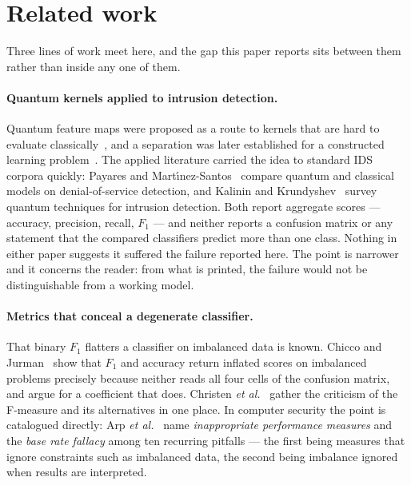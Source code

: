 \documentclass[runningheads]{llncs}
\newcommand{\Fone}{F_1}
\begin{document}
\section{Related work}\label{sec:related}

Three lines of work meet here, and the gap this paper reports sits between
them rather than inside any one of them.

\paragraph{Quantum kernels applied to intrusion detection.}
Quantum feature maps were proposed as a route to kernels that are hard to
evaluate classically~\cite{havlicek2019,schuld2019hilbert}, and a separation
was later established for a constructed learning
problem~\cite{liu2021speedup}. The applied literature carried the idea to
standard IDS corpora quickly: Payares and
Mart\'{\i}nez-Santos~\cite{payares2021dos} compare quantum and classical
models on denial-of-service detection, and Kalinin and
Krundyshev~\cite{kalinin2023qids} survey quantum techniques for intrusion
detection. Both report aggregate scores --- accuracy, precision, recall,
$\Fone$ --- and neither reports a confusion matrix or any statement that the
compared classifiers predict more than one class. Nothing in either paper
suggests it suffered the failure reported here. The point is narrower and it
concerns the reader: from what is printed, the failure would not be
distinguishable from a working model.

\paragraph{Metrics that conceal a degenerate classifier.}
That binary $\Fone$ flatters a classifier on imbalanced data is known.
Chicco and Jurman~\cite{chicco2020mcc} show that $\Fone$ and accuracy return
inflated scores on imbalanced problems precisely because neither reads all
four cells of the confusion matrix, and argue for a coefficient that does.
Christen \emph{et al.}~\cite{christen2023fmeasure} gather the criticism of
the F-measure and its alternatives in one place. In computer security the
point is catalogued directly: Arp \emph{et al.}~\cite{arp2022mlsec} name
\emph{inappropriate performance measures} and the \emph{base rate fallacy}
among ten recurring pitfalls --- the first being measures that ignore
constraints such as imbalanced data, the second being imbalance ignored when
results are interpreted.
\end{document}
